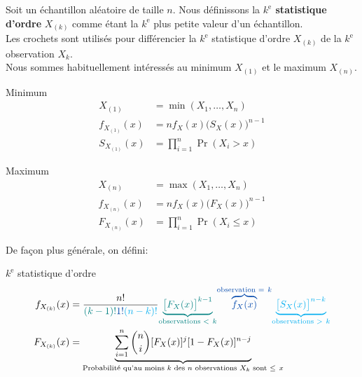 \documentclass[10pt, french]{article}
\begin{document}
\begin{multicols*}{2}
Soit un échantillon aléatoire de taille $n$.
Nous définissons la \textbf{$k^{\text{e}}$ statistique d'ordre} $X_{(k)}$ comme étant la $k^{\text{e}}$ plus petite valeur d'un échantillon.\\
Les crochets sont utilisés pour différencier la $k^{\text{e}}$ statistique d'ordre $X_{(k)}$ de la $k^{\text{e}}$ observation $X_{k}$.\\

Nous sommes habituellement intéressés au minimum $X_{(1)}$ et le maximum $X_{(n)}$.

\setlength{\mathindent}{-0.75cm}
\begin{minipage}{0.5\columnwidth}
\begin{algo}{Minimum}
\begin{align*}
	X_{(1)}
	&=	\min(X_{1}, \dots, X_{n})	\\
	f_{X_{(1)}}(x)
	&=	n f_{X}(x) \big( S_{X}(x) \big)^{n - 1}	\\
	S_{X_{(1)}}(x)
	&=	\prod_{i = 1}^{n} \Pr(X_{i} > x)
\end{align*}
\end{algo}
\end{minipage}
\begin{minipage}{0.5\columnwidth}
\begin{algo}{Maximum}
\begin{align*}
	X_{(n)}
	&=	\max(X_{1}, \dots, X_{n})	\\
	f_{X_{(n)}}(x)
	&=	n f_{X}(x) \big( F_{X}(x) \big)^{n - 1}	\\
	F_{X_{(n)}}(x)
	&=	\prod_{i = 1}^{n} \Pr(X_{i} \le x)
\end{align*}
\end{algo}
\end{minipage}
\setlength{\mathindent}{1cm}

De façon plus générale, on défini:
\begin{algo}{$k^{\text{e}}$ statistique d'ordre}
\begin{align*}
	f_{X_{(k)}}(x)
	&=	\frac{n!}{\textcolor{teal}{(k - 1)!} \textcolor{cobalt}{1!} \textcolor{cyan}{(n - k)!}} \textcolor{teal}{\underset{\text{observations } < \ k}{\underbrace{\big[ F_{X}(x) \big]^{k - 1}}}} \textcolor{cobalt}{\overset{\text{observation } = \ k}{\overbrace{f_{X}(x)}}} \textcolor{cyan}{\underset{\text{observations } > \ k}{\underbrace{\big[ S_{X}(x) \big]^{n - k}}}} \\
	F_{X_{(k)}}(x)
	&=	\underset{\text{Probabilité qu'au moins } k \text{ des } n \text{ observations } X_{k} \text{ sont } \le \ x}{\underbrace{\sum_{i = 1}^{n} \binom{n}{i} [F_{X}(x)]^{j} [1 - F_{X}(x)]^{n - j}}}
\end{align*}
\end{algo}


\end{multicols*}
\end{document}

